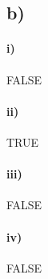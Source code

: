 \documentclass[
]{article}
\begin{document}
\hypertarget{b-3}{%
\subsection{b)}\label{b-3}}

\hypertarget{i-7}{%
\paragraph{i)}\label{i-7}}

FALSE

\hypertarget{ii-6}{%
\paragraph{ii)}\label{ii-6}}

TRUE

\hypertarget{iii-1}{%
\paragraph{iii)}\label{iii-1}}

FALSE

\hypertarget{iv-1}{%
\paragraph{iv)}\label{iv-1}}

FALSE
\end{document}
